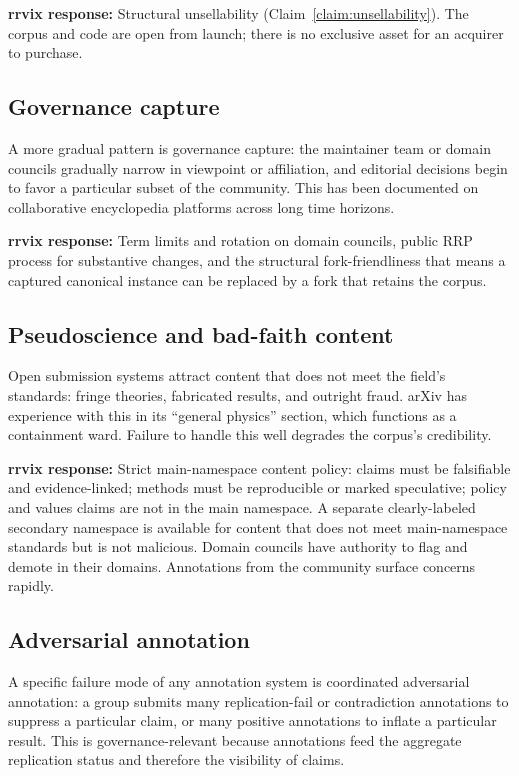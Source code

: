 \documentclass[11pt]{rrvix}
\begin{document}
\textbf{rrvix response:} Structural unsellability (Claim~\ref{claim:unsellability}). The corpus and code are open from launch; there is no exclusive asset for an acquirer to purchase.

\subsection{Governance capture}

A more gradual pattern is governance capture: the maintainer team or domain councils gradually narrow in viewpoint or affiliation, and editorial decisions begin to favor a particular subset of the community. This has been documented on collaborative encyclopedia platforms across long time horizons.

\textbf{rrvix response:} Term limits and rotation on domain councils, public RRP process for substantive changes, and the structural fork-friendliness that means a captured canonical instance can be replaced by a fork that retains the corpus.

\subsection{Pseudoscience and bad-faith content}

Open submission systems attract content that does not meet the field's standards: fringe theories, fabricated results, and outright fraud. arXiv has experience with this in its ``general physics'' section, which functions as a containment ward. Failure to handle this well degrades the corpus's credibility.

\textbf{rrvix response:} Strict main-namespace content policy: claims must be falsifiable and evidence-linked; methods must be reproducible or marked speculative; policy and values claims are not in the main namespace. A separate clearly-labeled secondary namespace is available for content that does not meet main-namespace standards but is not malicious. Domain councils have authority to flag and demote in their domains. Annotations from the community surface concerns rapidly.

\subsection{Adversarial annotation}

A specific failure mode of any annotation system is coordinated adversarial annotation: a group submits many replication-fail or contradiction annotations to suppress a particular claim, or many positive annotations to inflate a particular result. This is governance-relevant because annotations feed the aggregate replication status and therefore the visibility of claims.
\end{document}
